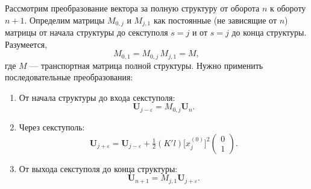 \documentclass[11pt,a4paper]{article}
\begin{document}
Рассмотрим преобразование вектора за полную структуру от оборота $n$ к обороту
$n+1$. Определим матрицы $M_{0,j}$ и $M_{j,1}$ как постоянные (не зависящие от
$n$) матрицы от начала структуры до секступоля $s=j$ и от $s=j$ до конца
структуры. Разумеется,
\begin{equation}
M_{0,1}=M_{0,j}\,M_{j,1}=M,
\end{equation}
где $M$ --- транспортная матрица полной структуры. Нужно применить последовательные
преобразования:

\begin{enumerate}
\item[(i)] От начала структуры до входа секступоля:
\begin{equation}
\mathbf{U}_{j-\varepsilon}=M_{0,j}\mathbf{U}_n.
\end{equation}
\item[(ii)] Через секступоль:
\begin{equation}
\mathbf{U}_{j+\varepsilon}
=\mathbf{U}_{j-\varepsilon}
+\tfrac12(K'l)\bigl[x_j^{(0)}\bigr]^2
\begin{pmatrix}0\\ 1\end{pmatrix}.
\end{equation}
\item[(iii)] От выхода секступоля до конца структуры:
\begin{equation}
\mathbf{U}_{n+1}=M_{j,1}\mathbf{U}_{j+\varepsilon}.
\end{equation}
\end{enumerate}
\end{document}
